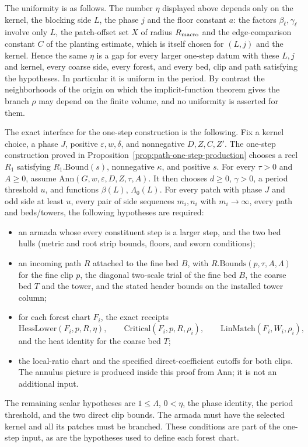 The uniformity is as follows. The number $\eta$ displayed above depends
only on the kernel, the blocking side $L$, the phase $j$ and the floor
constant $a$: the factors $\beta_\ell,\gamma_\ell$ involve only $L$, the
patch-offset set $X$ of radius $R_{\rm macro}$ and the edge-comparison
constant $C$ of the planting estimate, which is itself chosen for
$(L,j)$ and the kernel. Hence the same $\eta$ is a gap for every larger
one-step datum with these $L,j$ and kernel, every coarse side, every
forest, and every bed, clip and path satisfying the hypotheses. In
particular it is uniform in the period. By contrast the neighborhoods
of the origin on which the implicit-function theorem gives the branch
$\rho$ may depend on the finite volume, and no uniformity is asserted
for them.

The exact interface for the one-step construction is the following. Fix a
kernel choice, a phase $J$, positive $\varepsilon,w,\delta$, and
nonnegative $D,Z,C,Z'$. The one-step construction proved in Proposition~\ref{prop:path-one-step-production} chooses a reel $R_1$ satisfying
$R_1.\mathrm{Bound}(s)$, nonnegative $\kappa$, and positive $s$. For every
$\tau>0$ and $A\geq0$, assume
$\mathrm{Ann}(G,w,\varepsilon,D,Z,\tau,A)$. It then chooses
$d\geq0$, $\gamma>0$, a period threshold $u$, and functions $\beta(L)$,
$\Lambda_0(L)$. For every patch with phase $J$ and odd side at least $u$,
every pair of side sequences $m_i,n_i$ with $m_i\to\infty$, every path
and beds/towers, the following hypotheses are required:

\begin{itemize}
\item an armada whose every constituent step is a larger step, and the
  two bed hulls (metric and root strip bounds, floors, and sworn conditions);
\item an incoming path $R$ attached to the fine bed $B$, with
  $R.\mathrm{Bounds}(p,\tau,A,\Lambda)$ for the fine clip $p$, the
  diagonal two-scale trial of the fine bed $B$, the coarse bed $T$ and
  the tower, and the stated header bounds on the installed tower column;
\item for each forest chart $F_i$, the exact receipts
  \[
  \mathrm{HessLower}(F_i,p,R,\eta),\qquad
  \mathrm{Critical}(F_i,p,R,\rho_i),\qquad
  \mathrm{LinMatch}(F_i,W_i,\rho_i),
  \]
  and the heat identity for the coarse bed $T$;
\item the local-ratio chart and the specified direct-coefficient cutoffs
  for both clips. The annulus picture is produced inside this proof from
  $\mathrm{Ann}$; it is not an additional input.
\end{itemize}
The remaining scalar hypotheses are $1\leq\Lambda$, $0<\eta$, the phase
identity, the period threshold, and the two direct clip bounds. The armada
must have the selected kernel and all its patches must be branched. These
conditions are part of the one-step input, as are the hypotheses used to
define each forest chart.

